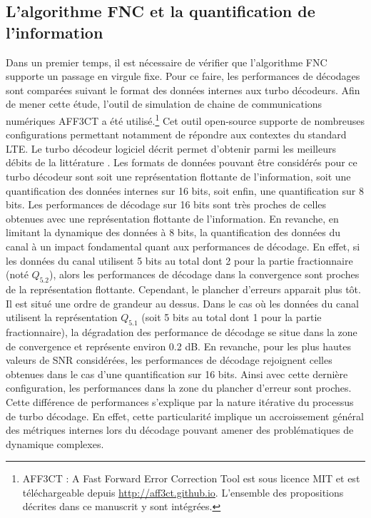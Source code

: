 \subsection{L'algorithme FNC et la quantification de l'information}
Dans un premier temps, il est nécessaire de vérifier que l'algorithme FNC supporte un passage en virgule fixe. Pour ce 
faire, les performances de décodages sont comparées suivant le format des données internes aux turbo décodeurs. 
Afin de mener cette étude, l'outil de simulation de chaine de communications numériques AFF3CT a été utilisé.\footnote{AFF3CT : A Fast Forward Error Correction Tool est sous licence MIT et est téléchargeable depuis \url{http://aff3ct.github.io}. L'ensemble des propositions décrites dans ce manuscrit y sont intégrées.} Cet outil 
open-source supporte de nombreuses configurations permettant notamment de répondre aux contextes du standard LTE. Le 
turbo décodeur logiciel décrit permet d'obtenir parmi les meilleurs débits de la littérature . 
Les formats de données pouvant être considérés pour ce turbo décodeur sont soit une représentation flottante de l'information, soit une quantification des données internes sur 16 bits, soit enfin, une quantification sur 8 bits.
Les performances de décodage sur 16 bits sont très proches de celles obtenues avec une 
représentation flottante de l'information. En revanche, en limitant la dynamique des données 
à 8 bits, la quantification des données du canal à un impact fondamental quant aux performances de décodage.
En effet, si les données du canal utilisent 5 bits au total dont 2 pour la partie fractionnaire 
(noté $Q_{5.2}$), alors les performances de décodage dans la convergence sont proches de la représentation flottante. Cependant, le plancher d'erreurs apparait plus tôt. Il est situé une ordre de grandeur au dessus. Dans le cas où les données du canal utilisent la représentation $Q_{5.1}$ (soit 5 bits au total dont 1 pour la partie fractionnaire), la dégradation des performance de décodage se situe dans la zone de convergence et représente environ 0.2 dB. En revanche, pour 
les plus hautes valeurs de SNR considérées, les performances de décodage rejoignent celles obtenues dans le cas d'une quantification sur 16 bits. Ainsi avec cette dernière configuration, les performances dans la zone du plancher 
d'erreur sont proches. Cette différence de performances s'explique par la nature itérative du processus de turbo 
décodage. En effet, cette particularité implique un accroissement général des métriques internes lors du décodage pouvant
amener des problématiques de dynamique complexes. 

